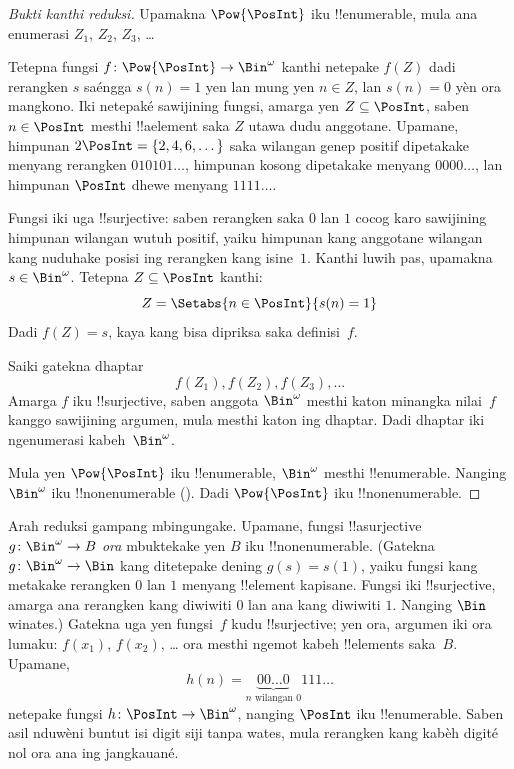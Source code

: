 \documentclass[../../../include/open-logic-section]{subfiles}
\begin{document}
\begin{proof}[Bukti {} kanthi reduksi]
Upamakna $\Pow{\PosInt}$ iku !!{enumerable}, mula ana
enumerasi $Z_{1}$, $Z_{2}$, $Z_{3}$, \dots

Tetepna fungsi $f \colon \Pow{\PosInt} \to \Bin^\omega$ kanthi netepake
$f(Z)$ dadi rerangken $s$ saéngga $s(n) = 1$ yen lan mung yen $n \in Z$,
lan $s(n) = 0$ yèn ora mangkono. Iki netepaké sawijining fungsi,
amarga yen $Z \subseteq \PosInt$, saben $n \in \PosInt$ mesthi
!!a{element} saka $Z$ utawa dudu anggotane. Upamane, himpunan $2\PosInt = \{2,
4, 6, \dots\}$ saka wilangan genep positif dipetakake menyang rerangken
$010101\dots$, himpunan kosong dipetakake menyang $0000\dots$, lan
himpunan $\PosInt$ dhewe menyang $1111\dots$.

Fungsi iki uga !!{surjective}: saben rerangken saka $0$ lan $1$ cocog
karo sawijining himpunan wilangan wutuh positif, yaiku himpunan kang
anggotane wilangan kang nuduhake posisi ing rerangken kang isine~$1$.
Kanthi luwih pas, upamakna $s \in \Bin^\omega$. Tetepna $Z
\subseteq \PosInt$ kanthi:
\[
Z = \Setabs{n \in \PosInt}{s(n) = 1}
\]
Dadi $f(Z) = s$, kaya kang bisa dipriksa saka definisi~$f$.

Saiki gatekna dhaptar
\[
f(Z_1), f(Z_2), f(Z_3), \dots
\]
Amarga $f$ iku !!{surjective}, saben anggota $\Bin^\omega$ mesthi
katon minangka nilai~$f$ kanggo sawijining argumen, mula mesthi
katon ing dhaptar. Dadi dhaptar iki ngenumerasi kabeh~$\Bin^\omega$.

Mula yen $\Pow{\PosInt}$ iku !!{enumerable}, $\Bin^\omega$ mesthi
!!{enumerable}. Nanging $\Bin^\omega$ iku !!{nonenumerable}
(). Dadi $\Pow{\PosInt}$ iku
!!{nonenumerable}.
\end{proof}

\begin{explain}
Arah reduksi gampang mbingungake.
Upamane, fungsi !!a{surjective} $g \colon \Bin^\omega \to B$
\emph{ora} mbuktekake yen $B$ iku !!{nonenumerable}. (Gatekna $g
\colon \Bin^\omega \to \Bin$ kang ditetepake dening $g(s) = s(1)$,
yaiku fungsi kang metakake rerangken $0$ lan $1$ menyang !!{element} kapisane.
Fungsi iki !!{surjective}, amarga ana rerangken kang diwiwiti $0$ lan
ana kang diwiwiti $1$. Nanging $\Bin$ winates.) Gatekna uga yen fungsi~$f$
kudu !!{surjective}; yen ora, argumen iki ora lumaku:
$f(x_1)$, $f(x_2)$, \dots{} ora mesthi ngemot
kabeh !!{element}s saka~$B$. Upamane,
\[
h(n) = \underbrace{00\dots0}_{\text{$n$ wilangan $0$}}111\dots
\]
netepake fungsi $h\colon \PosInt \to
\Bin^\omega$, nanging $\PosInt$ iku !!{enumerable}.
Saben asil nduwèni buntut isi digit siji tanpa wates, mula rerangken
kang kabèh digité nol ora ana ing jangkauané.
\end{explain}
\end{document}

